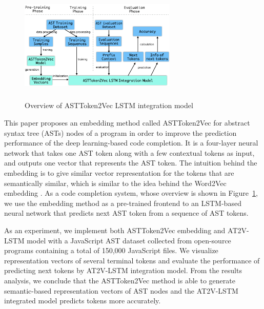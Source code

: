 \documentclass[E]{compsoft}
\begin{document}
\begin{figure}[!ht]
\centering
\includegraphics[width=7.5cm, height=5.5cm]{pictures/model_overview.png}
\caption{Overview of ASTToken2Vec LSTM integration model}
\label{fig:overivew_model}
\end{figure}
This paper proposes an embedding method called ASTToken2Vec for abstract syntax tree (ASTs) nodes of a program in order to improve the prediction performance of the deep learning-based code completion. 
It is a four-layer neural network that takes one AST token along with a few contextual tokens as input, and outputs one vector that represents the AST token.  The intuition behind the embedding is to give similar vector representation for the tokens that are semantically similar, which is similar to the idea behind the Word2Vec embedding \cite{word2vec}.
As a code completion system, whose overview is shown in Figure~\ref{fig:overivew_model}, we use the embedding method as a pre-trained frontend to an LSTM-based neural network that predicts next AST token from a sequence of AST tokens.

As an experiment, we implement both ASTToken2Vec embedding and AT2V-LSTM model with a JavaScript AST dataset\Cite{dataset} collected from open-source programs containing a total of 150,000 JavaScript files. 
We visualize representation vectors of several terminal tokens and evaluate the performance of predicting next tokens by AT2V-LSTM integration model.
From the results analysis, we conclude that the ASTToken2Vec method is able to generate semantic-based representation vectors of AST nodes and the AT2V-LSTM integrated model predicts tokens more accurately.
\end{document}
